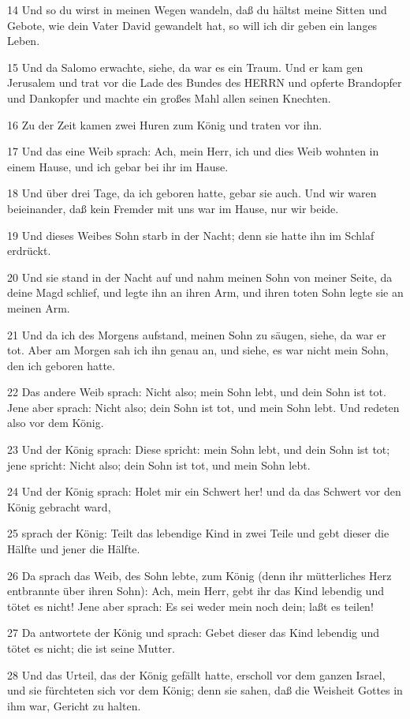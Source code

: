 \par 14 Und so du wirst in meinen Wegen wandeln, daß du hältst meine Sitten und Gebote, wie dein Vater David gewandelt hat, so will ich dir geben ein langes Leben.
\par 15 Und da Salomo erwachte, siehe, da war es ein Traum. Und er kam gen Jerusalem und trat vor die Lade des Bundes des HERRN und opferte Brandopfer und Dankopfer und machte ein großes Mahl allen seinen Knechten.
\par 16 Zu der Zeit kamen zwei Huren zum König und traten vor ihn.
\par 17 Und das eine Weib sprach: Ach, mein Herr, ich und dies Weib wohnten in einem Hause, und ich gebar bei ihr im Hause.
\par 18 Und über drei Tage, da ich geboren hatte, gebar sie auch. Und wir waren beieinander, daß kein Fremder mit uns war im Hause, nur wir beide.
\par 19 Und dieses Weibes Sohn starb in der Nacht; denn sie hatte ihn im Schlaf erdrückt.
\par 20 Und sie stand in der Nacht auf und nahm meinen Sohn von meiner Seite, da deine Magd schlief, und legte ihn an ihren Arm, und ihren toten Sohn legte sie an meinen Arm.
\par 21 Und da ich des Morgens aufstand, meinen Sohn zu säugen, siehe, da war er tot. Aber am Morgen sah ich ihn genau an, und siehe, es war nicht mein Sohn, den ich geboren hatte.
\par 22 Das andere Weib sprach: Nicht also; mein Sohn lebt, und dein Sohn ist tot. Jene aber sprach: Nicht also; dein Sohn ist tot, und mein Sohn lebt. Und redeten also vor dem König.
\par 23 Und der König sprach: Diese spricht: mein Sohn lebt, und dein Sohn ist tot; jene spricht: Nicht also; dein Sohn ist tot, und mein Sohn lebt.
\par 24 Und der König sprach: Holet mir ein Schwert her! und da das Schwert vor den König gebracht ward,
\par 25 sprach der König: Teilt das lebendige Kind in zwei Teile und gebt dieser die Hälfte und jener die Hälfte.
\par 26 Da sprach das Weib, des Sohn lebte, zum König (denn ihr mütterliches Herz entbrannte über ihren Sohn): Ach, mein Herr, gebt ihr das Kind lebendig und tötet es nicht! Jene aber sprach: Es sei weder mein noch dein; laßt es teilen!
\par 27 Da antwortete der König und sprach: Gebet dieser das Kind lebendig und tötet es nicht; die ist seine Mutter.
\par 28 Und das Urteil, das der König gefällt hatte, erscholl vor dem ganzen Israel, und sie fürchteten sich vor dem König; denn sie sahen, daß die Weisheit Gottes in ihm war, Gericht zu halten.

